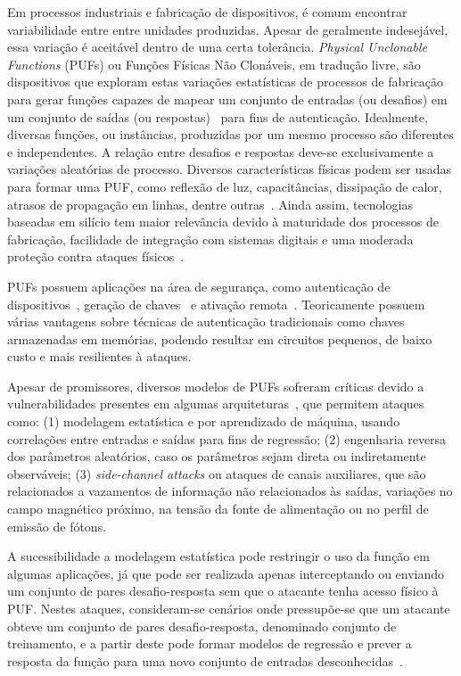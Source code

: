 \documentclass[pdftex,11pt]{article}
\begin{document}
\begin{spacing}{1.5}
Em processos industriais e fabricação de dispositivos, é comum encontrar variabilidade entre entre unidades produzidas. Apesar de geralmente indesejável, essa variação é aceitável dentro de uma certa tolerância. \textit{Physical Unclonable Functions} (PUFs) ou Funções Físicas Não Clonáveis, em tradução livre, são dispositivos que exploram estas variações estatísticas de processos de fabricação para gerar funções capazes de mapear um conjunto de entradas (ou desafios) em um conjunto de saídas (ou respostas)~\cite{bookspringerlink:10.1007} para fins de autenticação. Idealmente, diversas funções, ou instâncias, produzidas por um mesmo processo são diferentes e independentes. A relação entre desafios e respostas deve-se exclusivamente a variações aleatórias de processo. Diversos características físicas podem ser usadas para formar uma PUF, como reflexão de luz, capacitâncias, dissipação de calor, atrasos de propagação em linhas, dentre outras~\cite{bookspringerlink:10.1007,RF-DNA}. Ainda assim, tecnologias baseadas em silício tem maior relevância devido à maturidade dos processos de fabricação, facilidade de integração com sistemas digitais e uma moderada proteção contra ataques físicos~\cite{MajzoobiKP09,RfidPUF}.

PUFs possuem aplicações na área de segurança, como autenticação de dispositivos~\cite{SuhDevadas2007}, geração de chaves~\cite{LeeLGSDD_PUFSecretKey_VLSI04} e ativação remota~\cite{GassendCDD_CCSC02}. Teoricamente possuem várias vantagens sobre técnicas de autenticação tradicionais como chaves armazenadas em memórias, podendo resultar em circuitos pequenos, de baixo custo e mais resilientes à ataques.

Apesar de promissores, diversos modelos de PUFs sofreram críticas devido a vulnerabilidades presentes em algumas arquiteturas~\cite{PUFAnalysis, MajzoobiKP09, MajzoobiKP08}, que permitem ataques como:
(1) modelagem estatística e por aprendizado de máquina, usando correlações entre entradas e saídas para fins de regressão;
(2) engenharia reversa dos parâmetros aleatórios, caso os parâmetros sejam direta ou indiretamente observáveis;
(3) \textit{side-channel attacks} ou ataques de canais auxiliares, que são relacionados a vazamentos de informação não relacionados às saídas, variações no campo magnético próximo, na tensão da fonte de alimentação ou no perfil de emissão de fótons.

A sucessibilidade a modelagem estatística pode restringir o uso da função em algumas aplicações, já que pode ser realizada apenas interceptando ou enviando um conjunto de pares desafio-resposta sem que o atacante tenha acesso físico à PUF\@.
Nestes ataques, consideram-se cenários onde pressupõe-se que um atacante obteve um conjunto de pares desafio-resposta, denominado conjunto de treinamento, e a partir deste pode formar modelos de regressão e prever a resposta da função para uma novo conjunto de entradas desconhecidas~\cite{RuhrmairD13,RuhrmairSSDDS10}.


\end{spacing}
\end{document}
